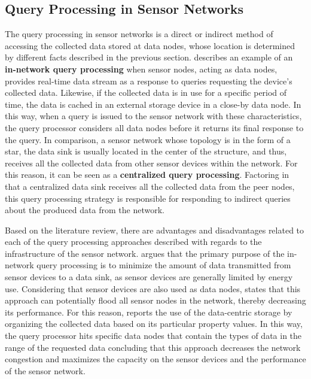 \subsection{Query Processing in Sensor Networks}
\label{sec:query-process}

The query processing in sensor networks is a direct or indirect method of
accessing the collected data stored at data nodes, whose location is determined
by different facts described in the previous section. \cite{sn-storage03}
describes an example of an \textbf{in-network query processing} when sensor
nodes, acting as data nodes, provides real-time data stream as a response
to queries requesting the device's collected data. Likewise, if the collected
data is in use for a specific period of time, the data is cached in an external
storage device in a close-by data node. In this way, when a query is issued to
the sensor network with these characteristics, the query processor considers 
all data nodes before it returns its final response to the query. In comparison, a sensor
network whose topology is in the form of a star, the data sink is usually
located in the center of the structure, and thus, receives all
the collected data from other sensor devices within the network. For this reason, it 
can be seen as a \textbf{centralized query processing}. Factoring in that a centralized data
sink receives all the collected data from the peer nodes, this query processing
strategy is responsible for responding to indirect queries about the
produced data from the network. 

Based on the literature review, there are advantages and disadvantages related to
each of the query processing approaches described with regards to the
infrastructure of the sensor network. \cite{sn-storage03} argues that the 
primary purpose of the in-network query processing is to minimize the amount
of data transmitted from sensor devices to a data sink, as sensor devices are
generally limited by energy use. Considering that sensor devices are also used
as data nodes, \cite{sn-storage04} states that this approach can potentially
flood all sensor nodes in the network, thereby decreasing its performance.
For this reason, \cite{sn-storage01} reports the use of the data-centric
storage by organizing the collected data based on its particular property
values. In this way, the query processor hits specific data nodes that contain
the types of data in the range of the requested data concluding that this approach 
decreases the network congestion and maximizes the
capacity on the sensor devices and the performance of the sensor network.

